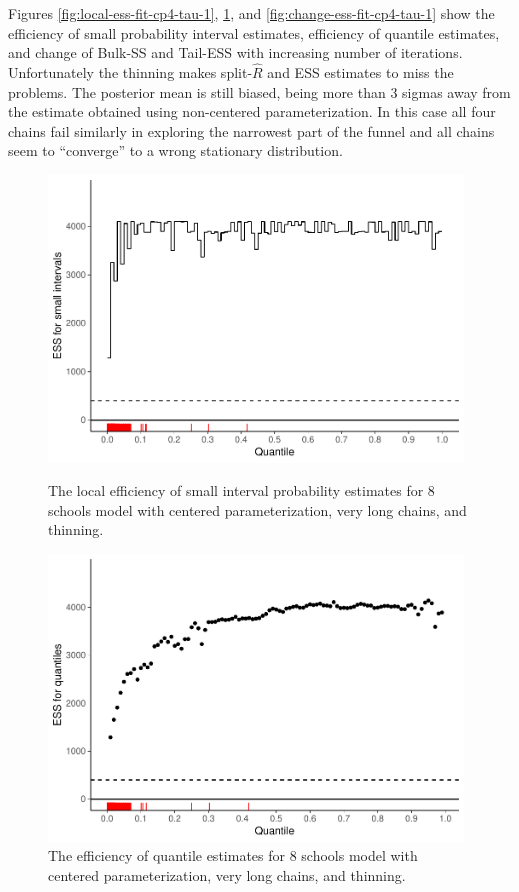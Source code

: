 \documentclass[american,]{article}
\begin{document}
Figures \ref{fig:local-ess-fit-cp4-tau-1},
\ref{fig:quantile-ess-fit-cp4-tau-1}, and
\ref{fig:change-ess-fit-cp4-tau-1} show the efficiency of small
probability interval estimates, efficiency of quantile estimates, and
change of Bulk-SS and Tail-ESS with increasing number of iterations.
Unfortunately the thinning makes split-\(\widehat{R}\) and ESS
estimates to miss the problems. The posterior mean is still biased,
being more than 3 sigmas away from the estimate obtained using
non-centered parameterization. In this case all four chains fail
similarly in exploring the narrowest part of the funnel and all
chains seem to ``converge'' to a wrong stationary distribution.
\begin{figure}[tp]
  \centering
  \begin{minipage}{0.48\textwidth}
  \includegraphics[width=0.98\textwidth]{graphics/local-ess-fit-cp4-tau-1.pdf}
  \caption{The local efficiency of small interval probability estimates for 8 schools model with centered parameterization, very long chains, and thinning.}
  \label{fig:local-ess-fit-cp4-tau-1}
\end{minipage}
\hfill
  \begin{minipage}{0.48\textwidth}
  \includegraphics[width=0.98\textwidth]{graphics/quantile-ess-fit-cp4-tau-1.pdf}
  \caption{The efficiency of quantile estimates for 8 schools model with centered parameterization, very long chains, and thinning.}
  \label{fig:quantile-ess-fit-cp4-tau-1}
\end{minipage}
\end{figure}
\end{document}
